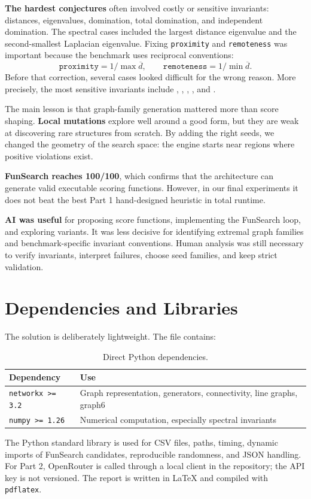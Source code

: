 \documentclass[11pt,a4paper]{article}
\begin{document}
\textbf{The hardest conjectures} often involved costly or sensitive invariants: distances, eigenvalues, domination, total domination, and independent domination. The spectral cases included the largest distance eigenvalue and the second-smallest Laplacian eigenvalue. Fixing \texttt{proximity} and \texttt{remoteness} was important because the benchmark uses reciprocal conventions:
\[
\texttt{proximity}=1/\max \overline{d}, \qquad
\texttt{remoteness}=1/\min \overline{d}.
\]
Before that correction, several cases looked difficult for the wrong reason. More precisely, the most sensitive invariants include , , , , and .

The main lesson is that graph-family generation mattered more than score shaping. \textbf{Local mutations} explore well around a good form, but they are weak at discovering rare structures from scratch. By adding the right seeds, we changed the geometry of the search space: the engine starts near regions where positive violations exist.

\textbf{FunSearch reaches 100/100}, which confirms that the architecture can generate valid executable scoring functions. However, in our final experiments it does not beat the best Part 1 hand-designed heuristic in total runtime.

\textbf{AI was useful} for proposing score functions, implementing the FunSearch loop, and exploring variants. It was less decisive for identifying extremal graph families and benchmark-specific invariant conventions. Human analysis was still necessary to verify invariants, interpret failures, choose seed families, and keep strict validation.

\section{Dependencies and Libraries}

The solution is deliberately lightweight. The  file contains:

\begin{table}[H]
\centering
\begin{tabular}{ll}
\toprule
Dependency & Use \\
\midrule
\texttt{networkx >= 3.2} & Graph representation, generators, connectivity, line graphs, graph6 \\
\texttt{numpy >= 1.26} & Numerical computation, especially spectral invariants \\
\bottomrule
\end{tabular}
\caption{Direct Python dependencies.}
\end{table}

The Python standard library is used for CSV files, paths, timing, dynamic imports of FunSearch candidates, reproducible randomness, and JSON handling. For Part 2, OpenRouter is called through a local client in the repository; the API key is not versioned. The report is written in LaTeX and compiled with \texttt{pdflatex}.
\end{document}
